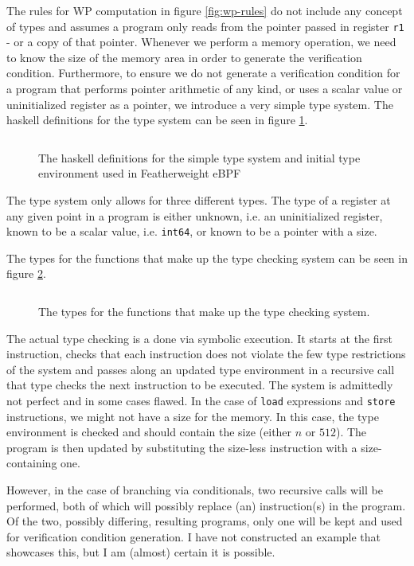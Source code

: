 The rules for WP computation in figure \ref{fig:wp-rules} do not include any concept of types and assumes a program only reads from the pointer passed in register \texttt{r1} - or a copy of that pointer.
Whenever we perform a memory operation, we need to know the size of the memory area in order to generate the verification condition. Furthermore, to ensure we do not generate a verification condition for a program that performs pointer arithmetic of any kind, or uses a scalar value or uninitialized register as a pointer, we introduce a very simple type system. The haskell definitions for the type system can be seen in figure \ref{snip:types}.

\begin{figure}[ht]
  \centering
\inputminted[linenos]{haskell}{snippets/types.hs}
  \caption{The haskell definitions for the simple type system and initial type environment used in Featherweight eBPF}
  \label{snip:types}
\end{figure}


The type system only allows for three different types. The type of a register at any given point in a program is either unknown, i.e. an uninitialized register, known to be a scalar value, i.e. \texttt{int64}, or known to be a pointer with a size.

The types for the functions that make up the type checking system can be seen in figure \ref{snip:typecheck}.

\begin{figure}[ht]
  \centering
\inputminted[linenos,breaklines]{haskell}{snippets/typecheck.hs}
  \caption{The types for the functions that make up the type checking system.}
  \label{snip:typecheck}
\end{figure}



The actual type checking is a done via symbolic execution. It starts at the first instruction, checks that each instruction does not violate the few type restrictions of the system and passes along an updated type environment in a recursive call that type checks the next instruction to be executed.
The system is admittedly not perfect and in some cases flawed.
In the case of \texttt{load} expressions and \texttt{store} instructions, we might not have a size for the memory. In this case, the type environment is checked and should contain the size (either $n$ or $512$). The program is then updated by substituting the size-less instruction with a size-containing one.

However, in the case of branching via conditionals, two recursive calls will be performed, both of which will possibly replace (an) instruction(s) in the program. Of the two, possibly differing, resulting programs, only one will be kept and used for verification condition generation.
I have not constructed an example that showcases this, but I am (almost) certain it is possible. 


